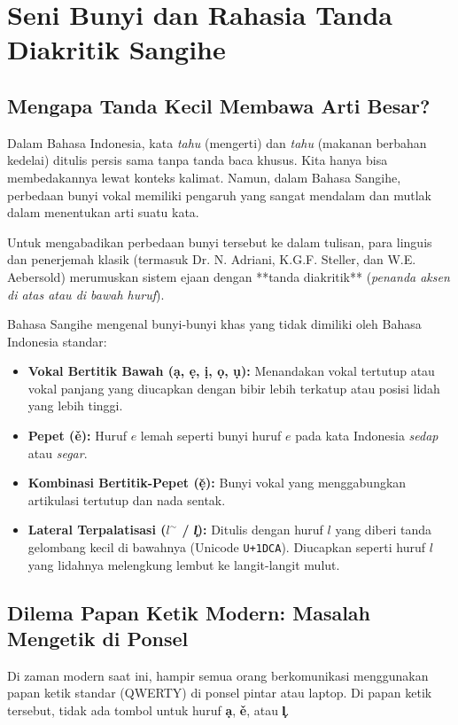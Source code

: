 \chapter{Seni Bunyi dan Rahasia Tanda Diakritik Sangihe}

\section{Mengapa Tanda Kecil Membawa Arti Besar?}
Dalam Bahasa Indonesia, kata \textit{tahu} (mengerti) dan \textit{tahu} (makanan berbahan kedelai) ditulis persis sama tanpa tanda baca khusus. Kita hanya bisa membedakannya lewat konteks kalimat. Namun, dalam Bahasa Sangihe, perbedaan bunyi vokal memiliki pengaruh yang sangat mendalam dan mutlak dalam menentukan arti suatu kata.

Untuk mengabadikan perbedaan bunyi tersebut ke dalam tulisan, para linguis dan penerjemah klasik (termasuk Dr. N. Adriani, K.G.F. Steller, dan W.E. Aebersold) merumuskan sistem ejaan dengan **tanda diakritik** (\textit{penanda aksen di atas atau di bawah huruf}).

\begin{linguisticbox}
Bahasa Sangihe mengenal bunyi-bunyi khas yang tidak dimiliki oleh Bahasa Indonesia standar:
\begin{itemize}
    \item \textbf{Vokal Bertitik Bawah (\d{a}, \d{e}, \d{i}, \d{o}, \d{u}):} Menandakan vokal tertutup atau vokal panjang yang diucapkan dengan bibir lebih terkatup atau posisi lidah yang lebih tinggi.
    \item \textbf{Pepet (\v{e}):} Huruf $e$ lemah seperti bunyi huruf $e$ pada kata Indonesia \textit{sedap} atau \textit{segar}.
    \item \textbf{Kombinasi Bertitik-Pepet (\v{\d{e}}):} Bunyi vokal yang menggabungkan artikulasi tertutup dan nada sentak.
    \item \textbf{Lateral Terpalatisasi ($l^\sim$ / \textit{l᷊}):} Ditulis dengan huruf $l$ yang diberi tanda gelombang kecil di bawahnya (Unicode \texttt{U+1DCA}). Diucapkan seperti huruf $l$ yang lidahnya melengkung lembut ke langit-langit mulut.
\end{itemize}
\end{linguisticbox}

\section{Dilema Papan Ketik Modern: Masalah Mengetik di Ponsel}
Di zaman modern saat ini, hampir semua orang berkomunikasi menggunakan papan ketik standar (QWERTY) di ponsel pintar atau laptop. Di papan ketik tersebut, tidak ada tombol untuk huruf \textbf{\d{a}}, \textbf{\v{e}}, atau \textbf{l᷊}.

